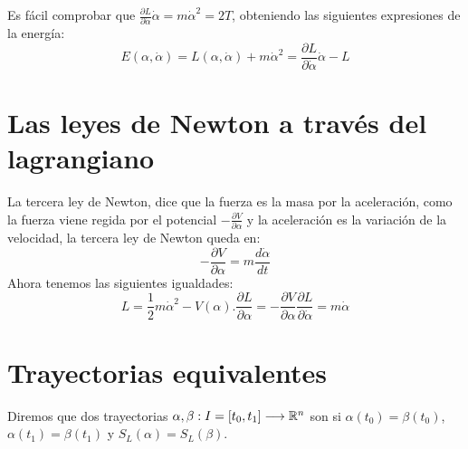 Es fácil comprobar que $\frac{\partial L}{\partial\dot{\alpha}}\dot{\alpha}=m\dot{\alpha}^2=2T$, obteniendo las siguientes expresiones de la energía:
\begin{equation}
    \label{eq:energia_lagrangiana}
    E(\alpha, \dot{\alpha})=L(\alpha, \dot{\alpha})+m\dot{\alpha}^2=\frac{\partial L}{\partial\dot{\alpha}}\dot{\alpha}-L
\end{equation}


\section{Las leyes de Newton a través del lagrangiano}
La tercera ley de Newton, dice que la fuerza es la masa por la aceleración, como la fuerza viene regida por el potencial $-\frac{\partial V}{\partial\alpha}$ y la aceleración es la variación de la velocidad, la tercera ley de Newton queda en:
\begin{equation*}
    -\frac{\partial V}{\partial\alpha} = m\frac{d\dot{\alpha}}{dt}
\end{equation*}
Ahora tenemos las siguientes igualdades:
\begin{subequations}
    \begin{equation*}
        L=\frac{1}{2}m\dot{\alpha}^2-V(\alpha).
    \end{equation*}
    \begin{equation*}
        \frac{\partial L}{\partial \alpha}=-\frac{\partial V}{\partial \alpha}
    \end{equation*}
    \begin{equation*}
        \frac{\partial L}{\partial\dot{\alpha}}=m\dot{\alpha}
    \end{equation*}
\end{subequations}


\section{Trayectorias equivalentes}
\begin{definition}
    Diremos que dos trayectorias $\alpha,\beta:I=[t_0, t_1]\longrightarrow \mathbb{R}^n$ son  si $\alpha(t_0)=\beta(t_0)$, $\alpha(t_1)=\beta(t_1)$ y $S_L(\alpha)=S_L(\beta)$.
\end{definition}


